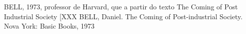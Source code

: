\documentclass[
12pt,		%
openright,	%
twoside,  %
a4paper,			%
chapter=TITLE,		%
english,			%
french,				%
spanish,			%
brazil				%
]{USPSC-classe/USPSC}
\begin{document}
\begin{flushleft}
\begin{flushleft}
\begin{flushleft}
\begin{flushleft}
\begin{flushleft}
\begin{flushleft}
\begin{flushleft}
\begin{flushleft}
\begin{flushleft}
\begin{flushleft}
\begin{flushleft}
\begin{flushleft}
\begin{flushleft}
\begin{flushleft}
[BELL, 1973]  BELL, 1973, professor de Harvard, que a partir do texto The Coming of Post Industrial Society [XXX BELL, Daniel. The Coming of Post-industrial Society. Nova York: Basic Books, 1973
\end{flushleft}


\end{flushleft}


\end{flushleft}


\end{flushleft}


\end{flushleft}


\end{flushleft}


\end{flushleft}


\end{flushleft}


\end{flushleft}


\end{flushleft}


\end{flushleft}


\end{flushleft}


\end{flushleft}


\end{flushleft}
\end{document}
